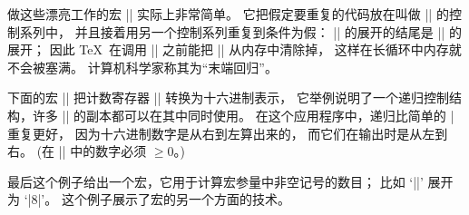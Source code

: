{{{{{{{{{{%
\let\d=\plaind
\ddanger 做这些漂亮工作的宏 |\loop| 实际上非常简单。%
它把假定要重复的代码放在叫做 |\body| 的控制系列中，
并且接着用另一个控制系列重复到条件为假：
\begintt
\def\loop#1\repeat{\def\body{#1}\iterate}
\def\iterate{\body\let\next=\iterate\else\let\next=\relax\fi\next}
\endtt
|\iterate| 的展开的结尾是 |\next| 的展开；
因此 \TeX\ 在调用 |\next| 之前能把 |\iterate| 从内存中清除掉，
这样在长循环中内存就不会被塞满。%
计算机科学家称其为``末端回归''。

\ddanger 下面的宏 |\hex| 把计数寄存器 |\n| 转换为十六进制表示，
它举例说明了一个{递归}控制结构，许多 |\hex| 的副本都可以在其中同时使用。%
在这个应用程序中，递归比简单的 |\loop| 重复更好，
因为十六进制数字是从右到左算出来的，
而它们在输出时是从左到右。
(在 |\n| 中的数字必须 $\ge0$。)
\begintt
\def\hex{{\count0=\n \divide\n by16
  \ifnum\n>0 \hex\fi \count2=\n \multiply\count2 by-16
  \advance\count0 by\count2 \hexdigit}}
\def\hexdigit{\ifnum\count0<10 \number\count0
  \else\advance\count0 by-10 \advance\count0 by`A \char\count0 \fi}
\endtt

\ddanger 最后这个例子给出一个宏，它用于计算宏参量中非空记号的数目；
比如 `||' 展开为 `|8|'。
这个例子展示了宏的另一个方面的技术。
\begintt
\def\length#1{{\count0=0 \getlength#1\end \number\count0}}
\def\getlength#1{\ifx#1\end \let\next=\relax
  \else\advance\count0 by1 \let\next=\getlength\fi \next}
\endtt

}}}}}}}}}}
